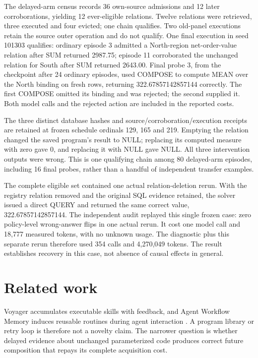 \documentclass[10pt,twocolumn]{article}
\begin{document}
The delayed-arm census records 36 own-source admissions and 12 later
corroborations, yielding 12 ever-eligible relations. Twelve relations were
retrieved, three executed and four evicted; one chain qualifies. Two old-panel
executions retain the source outer operation and do not qualify. One final
execution in seed 101303 qualifies: ordinary episode 3 admitted a North-region
net-order-value relation after SUM returned 2987.75; episode 11 corroborated
the unchanged relation for South after SUM returned 2643.00. Final probe 3,
from the checkpoint after 24 ordinary episodes, used COMPOSE to compute MEAN
over the North binding on fresh rows, returning 322.67857142857144 correctly.
The first COMPOSE omitted its binding and was rejected; the second supplied it.
Both model calls and the rejected action are included in the reported costs.

The three distinct database hashes and source/corroboration/execution receipts
are retained at frozen schedule ordinals 129, 165 and 219. Emptying the relation
changed the saved program's result to NULL; replacing its computed measure with
zero gave 0, and replacing it with NULL gave NULL. All three intervention
outputs were wrong. This is one qualifying chain among 80 delayed-arm episodes,
including 16 final probes, rather than a handful of independent transfer examples.

The complete eligible set contained one actual relation-deletion rerun. With
the registry relation removed and the original SQL evidence retained, the
solver issued a direct QUERY and returned the same correct value,
322.67857142857144. The independent audit replayed this single frozen case:
zero policy-level wrong-answer flips in one actual rerun. It cost one model
call and 18,777 measured tokens, with no unknown usage. The diagnostic plus
this separate rerun therefore used 354 calls and 4,270,049 tokens. The result
establishes recovery in this case, not absence of causal effects in general.

\section{Related work}
Voyager accumulates executable skills with feedback, and Agent Workflow Memory
induces reusable routines during agent interaction
\citep{wang2023voyager,wang2024awm}. A program library or retry loop is therefore
not a novelty claim. The narrower question is whether delayed evidence about
unchanged parameterized code produces correct future composition that repays
its complete acquisition cost.
\end{document}
